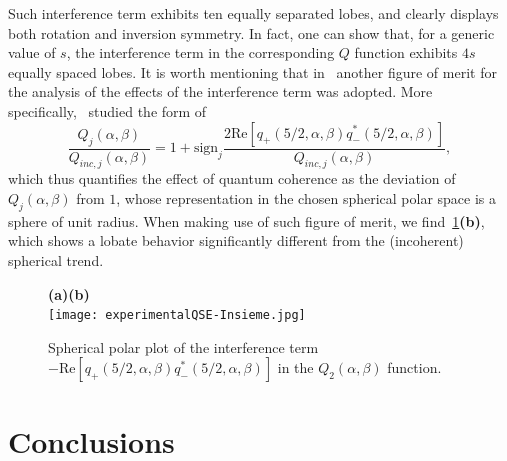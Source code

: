 Such interference term exhibits ten equally separated lobes, and clearly displays both rotation and inversion symmetry. In fact, one can show that, for a generic value of $s$, the interference term in the corresponding $Q$ function exhibits $4s$ equally spaced lobes. It is worth mentioning that in~\cite{agarwal1997atomic} another figure of merit for the analysis of the effects of the interference term was adopted. More specifically,~\cite{agarwal1997atomic} studied the form of 
\begin{equation}
\frac{Q_j(\alpha,\beta)}{Q_{inc,j}(\alpha,\beta)}=1+\text{sign}_j\frac{2\text{Re}[q_+(5/2,\alpha,\beta)q^*_-(5/2,\alpha,\beta)]}{Q_{inc,j}(\alpha,\beta)},
\end{equation}
which thus quantifies the effect of quantum coherence as the deviation of $Q_j(\alpha,\beta)$ from $1$, whose representation in the chosen spherical polar space is a sphere of unit radius. When making use of such figure of merit, we find~\cref{fig:expQWs:SCS_plots}\textbf{(b)}, which shows a lobate behavior significantly different from the (incoherent) spherical trend. 

\begin{figure}[tb]
    \centering
    {\bf (a)}\hskip8cm{\bf (b)}\\
    \texttt{[image: experimentalQSE-Insieme.jpg]}
    \caption{Spherical polar plot of the interference term $-\text{Re}[q_+(5/2,\alpha,\beta)q^*_-(5/2,\alpha,\beta)]$ in the $Q_2(\alpha,\beta)$ function.}
    \label{fig:expQWs:SCS_plots}
\end{figure}



\section{Conclusions}
\label{sec:expQWs:conclusions}

